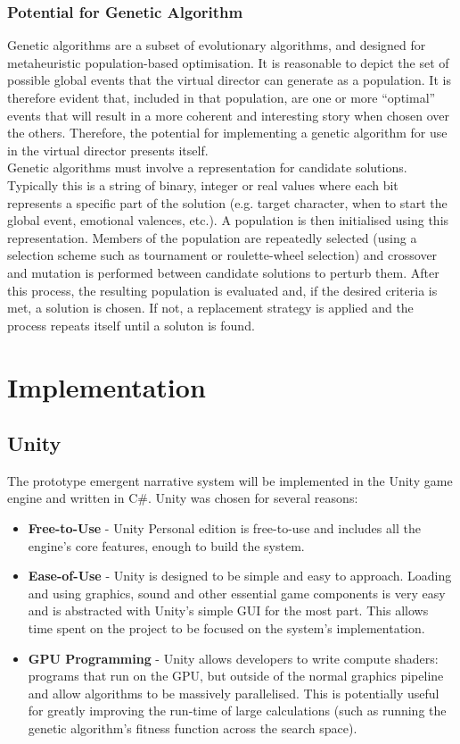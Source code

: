 \documentclass{sig-alternate-05-2015}
\begin{document}
\subsubsection{Potential for Genetic Algorithm}

Genetic algorithms are a subset of evolutionary algorithms, and designed for metaheuristic population-based optimisation. It is reasonable to depict the set of possible global events that the virtual director can generate as a population. It is therefore evident that, included in that population, are one or more ``optimal'' events that will result in a more coherent and interesting story when chosen over the others. Therefore, the potential for implementing a genetic algorithm for use in the virtual director presents itself.\\

Genetic algorithms must involve a representation for candidate solutions. Typically this is a string of binary, integer  or real values where each bit represents a specific part of the solution (e.g. target character, when to start the global event, emotional valences, etc.). A population is then initialised using this representation. Members of the population are repeatedly selected (using a selection scheme such as tournament or roulette-wheel selection) and crossover and mutation is performed between candidate solutions to perturb them. After this process, the resulting population is evaluated and, if the desired criteria is met, a solution is chosen. If not, a replacement strategy is applied and the process repeats itself until a soluton is found.

\section{Implementation}
\subsection{Unity}

\noindent The prototype emergent narrative system will be implemented in the Unity game engine and written in C\#. Unity was chosen for several reasons:
\begin{itemize}
	\item \textbf{Free-to-Use} - Unity Personal edition is free-to-use and includes all the engine’s core features, enough to build the system.
	\item \textbf{Ease-of-Use} - Unity is designed to be simple and easy to approach. Loading and using graphics, sound and other essential game components is very easy and is abstracted with Unity's simple GUI for the most part. This allows time spent on the project to be focused on the system's implementation.
	\item \textbf{GPU Programming} - Unity allows developers to write compute shaders: programs that run on the GPU, but outside of the normal graphics pipeline and allow algorithms to be massively parallelised. This is potentially useful for greatly improving the run-time of large calculations (such as running the genetic algorithm's fitness function across the search space).
\end{itemize}
\end{document}
